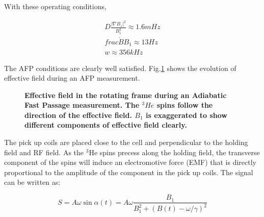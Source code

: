With these operating conditions, 

\begin{subequations}
	\begin{gather}
	D\frac{|\nabla B_{z}|^{2}}{B_{1}^{2}} \approx 1.6mHz\\
	frac{\dot B}{B_{1}} \approx 13Hz\\
	w \approx 356kHz
	\end{gather}
\end{subequations}

The AFP conditions are clearly well satisfied. Fig.\ref{AFP} shows the evolution of effective field during an AFP measurement.

\begin{figure}[H]
	\centering
	\caption{{\bf Effective field in the rotating frame during an Adiabatic Fast Passage measurement. The $^{3}He$ spins follow the direction of the effective field. $B_{1}$ is exaggerated to show different components of effective field clearly.}}
	\label{AFP}
\end{figure}

The pick up coils are placed close to the cell and perpendicular to the holding field and RF field. As the $^{3}$He spins precess along the holding field, the transverse component of the spins will induce an electromotive force (EMF) that is directly proportional to the amplitude of the component in the pick up coils. The signal can be written as:

\begin{equation}
S=A\omega \sin{\alpha(t)}=A\omega \frac{B_{1}}{B_{1}^{2}+(B(t)-\omega/\gamma)^{2}}
\end{equation}

